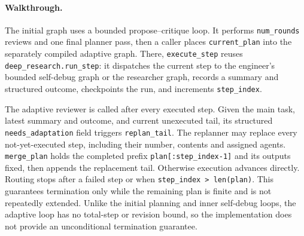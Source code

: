 \paragraph{Walkthrough.}
The initial graph uses a bounded propose--critique loop. It performs
\texttt{num\_rounds} reviews and one final planner pass, then a caller places
\texttt{current\_plan} into the separately compiled adaptive graph. There,
\texttt{execute\_step} reuses \texttt{deep\_research.run\_step}: it dispatches the
current step to the engineer's bounded self-debug graph or the researcher graph,
records a summary and structured outcome, checkpoints the run, and increments
\texttt{step\_index}.

The adaptive reviewer is called after every executed step. Given the main task,
latest summary and outcome, and current unexecuted tail, its structured
\texttt{needs\_adaptation} field triggers \texttt{replan\_tail}. The replanner may
replace every not-yet-executed step, including their number, contents and assigned
agents. \texttt{merge\_plan} holds the completed prefix
\texttt{plan[:step\_index-1]} and its outputs fixed, then appends the replacement
tail. Otherwise execution advances directly. Routing stops after a failed step or
when \texttt{step\_index > len(plan)}. This guarantees termination only while the
remaining plan is finite and is not repeatedly extended. Unlike the initial
planning and inner self-debug loops, the adaptive loop has no total-step or
revision bound, so the implementation does not provide an unconditional
termination guarantee.
